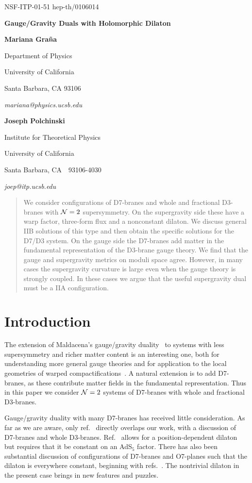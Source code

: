 \documentclass[a4paper,12pt]{article}
\renewcommand{\=}[1]{\bar{#1}}
\newcommand{\sect}[1]{\section{#1}\setcounter{equation}{0}}
\begin{document}
\bigskip
\hskip 5in\vbox{\baselineskip12pt
\hbox{NSF-ITP-01-51}
\hbox{hep-th/0106014}}
\bigskip\bigskip

\centerline{\Large \bf Gauge/Gravity Duals with Holomorphic Dilaton
}
\bigskip
\centerline{\bf Mariana Gra\~na}
\medskip
\centerline{Department of Physics}
\centerline{University of California}
\centerline{Santa Barbara, CA 93106}
\centerline{\it mariana@physics.ucsb.edu}
\bigskip
\centerline{\bf Joseph Polchinski}
\medskip
\centerline{Institute for Theoretical Physics}
\centerline{University of California}
\centerline{Santa Barbara, CA\ \ 93106-4030}
\centerline{\it joep@itp.ucsb.edu}


\begin{abstract}

We consider configurations of D7-branes and whole and fractional D3-branes
with ${\cal N}=2$ supersymmetry.
On the supergravity side these have a warp factor, three-form flux and a
nonconstant dilaton. We discuss general IIB solutions of this type
and then obtain the specific solutions for the D7/D3 system.  On the gauge side the
D7-branes add matter in the fundamental representation of the D3-brane gauge
theory. We find that the gauge and supergravity metrics on moduli space agree. 
However, in many cases the supergravity curvature is large even when
the gauge theory is strongly coupled.  In these cases we argue that the useful
supergravity dual must be a IIA configuration. 




\end{abstract}

\newpage
\baselineskip=17pt

\sect{Introduction}

The extension of Maldacena's gauge/gravity duality~\cite{maldacena} to systems
with less supersymmetry and richer matter content is an interesting one, both for
understanding more general gauge theories and for application to the local
geometries of warped compactifications~\cite{us}.  A natural extension is to add
D7-branes, as these contribute matter fields in the fundamental representation. 
Thus in this paper we consider ${\cal N}=2$ systems of D7-branes with whole and
fractional D3-branes.

Gauge/gravity duality with many D7-branes has received little consideration.
As far as we are aware, only ref.~\cite{Aharonyetal} directly overlaps our
work, with a discussion of D7-branes and
whole D3-branes.  Ref.~\cite{kehag} allows for a position-dependent dilaton
but requires that it be constant on an AdS$_5$ factor.  There has also been
substantial discussion of configurations of D7-branes and O7-planes such that
the dilaton is everywhere constant, beginning with
refs.~\cite{condil,Aharonyetal}.  The nontrivial dilaton in the present case
brings in new features and puzzles.
\end{document}

